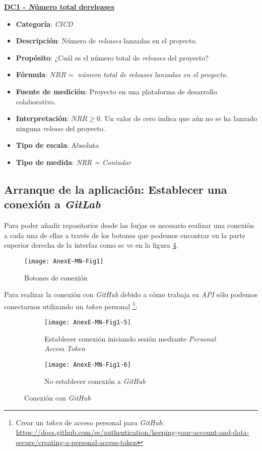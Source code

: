 \textbf{\underline{DC1 - \textit Número total de{releases}}}
\begin{itemize}
	\item \textbf{Categoría}: \textit{CICD}
	\item \textbf{Descripción}: Número de \textit{releases} lanzadas en el proyecto.
	\item \textbf{Propósito}: ¿Cuál es el número total de \textit{releases} del  proyecto?
	\item \textbf{Fórmula}: $NRR =$ \textit{número total de releases lanzadas en el proyecto}.
	\item \textbf{Fuente de medición}: Proyecto en una plataforma de desarrollo colaborativo.
	\item \textbf{Interpretación}: $NRR \geq 0$. Un valor de cero indica que aún no se ha lanzado ninguna \textit{release} del proyecto.
	\item \textbf{Tipo de escala}: Absoluta
	\item \textbf{Tipo de medida}: \textit{NRR = Contador}
\end{itemize}

\subsection{Arranque de la aplicación: Establecer una conexión a \textit{GitLab}}
Para poder añadir repositorios desde las forjas es necesario realizar una conexión a cada una de ellas a través de los botones que podemos encontrar en la parte superior derecha de la interfaz como se ve en la figura \ref{fig:AnexE-MN-Fig1}.

\begin{figure}[!h]
	\centering
	\texttt{[image: AnexE-MN-Fig1]}
	\caption{Botones de conexión}\label{fig:AnexE-MN-Fig1}
\end{figure}
\FloatBarrier

Para realizar la conexión con \textit{GitHub} debido a cómo trabaja su \textit{API} sólo podemos conectarnos utilizando un \textit{token} personal \footnote{Crear un \textit{token} de acceso personal para \textit{GitHub}: \url{https://docs.github.com/es/authentication/keeping-your-account-and-data-secure/creating-a-personal-access-token}}:
\begin{figure}[!h]
	\centering
	\begin{subfigure}{.45\textwidth}
		\centering
		\texttt{[image: AnexE-MN-Fig1-5]}
		\caption{Establecer conexión iniciando sesión mediante \textit{Personal Access Token}}
		\label{fig:dialogo-conexion_contraseña}
	\end{subfigure}\hfill
	\begin{subfigure}{.45\textwidth}
		\centering
		\texttt{[image: AnexE-MN-Fig1-6]}
		\caption{No establecer conexión a \textit{GitHub}}
		\label{fig:dialogo-conexion_token}
	\end{subfigure}
	\caption{Conexión con \textit{GitHub}}
	\label{fig:AnexE-MN-Fig1}
\end{figure}


